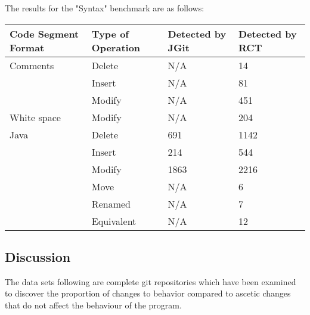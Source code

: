 The results for the "Syntax" benchmark are as follows:

\begin{table}[H]
    \begin{tabular}{llll}
    Code Segment Format & Type of Operation & Detected by JGit & Detected by RCT \\ \hline
    Comments               & Delete            & N/A              & 14                                   \\
    ~                      & Insert            & N/A              & 81                                   \\
    ~                      & Modify            & N/A              & 451                                  \\
    White space            & Modify            & N/A              & 204                                  \\
    Java                   & Delete            & 691              & 1142                                 \\
    ~                      & Insert            & 214              & 544                                  \\
    ~                      & Modify            & 1863             & 2216                                 \\
    ~                      & Move              & N/A              & 6                                    \\
    ~                      & Renamed           & N/A              & 7                                    \\
    ~                      & Equivalent        & N/A              & 12                                   \\
    \end{tabular}
\end{table}
\subsection{Discussion}

The data sets following are complete git repositories which have been examined to discover the proportion of changes to behavior compared to ascetic changes that do not affect the behaviour of the program. 

